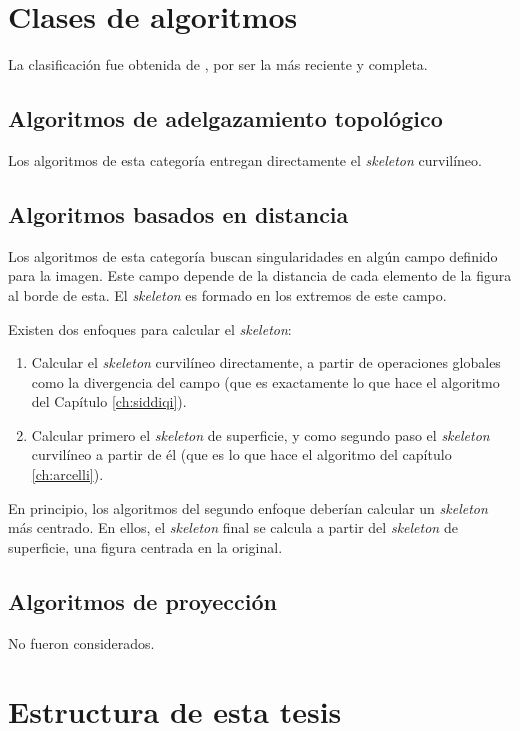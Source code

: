 \section{Clases de algoritmos}

La clasificación fue obtenida de \cite{tagliasacchi20163d}, por ser la más reciente y completa.

\subsection{Algoritmos de adelgazamiento topológico}

Los algoritmos de esta categoría entregan directamente el \textit{skeleton} curvilíneo.

\subsection{Algoritmos basados en distancia}

Los algoritmos de esta categoría buscan singularidades en algún campo definido para la imagen. Este campo depende de la distancia de cada elemento de la figura al borde de esta. El \textit{skeleton} es formado en los extremos de este campo.

Existen dos enfoques para calcular el \textit{skeleton}:

\begin{enumerate}
\item Calcular el \textit{skeleton} curvilíneo directamente, a partir de operaciones globales como la divergencia del campo (que es exactamente lo que hace el algoritmo del Capítulo \ref{ch:siddiqi}).
\item Calcular primero el \textit{skeleton} de superficie, y como segundo paso el \textit{skeleton} curvilíneo a partir de él (que es lo que hace el algoritmo del capítulo \ref{ch:arcelli}).
\end{enumerate}

En principio, los algoritmos del segundo enfoque deberían calcular un \textit{skeleton} más centrado. En ellos, el \textit{skeleton} final se calcula a partir del \textit{skeleton} de superficie, una figura centrada en la original.

\subsection{Algoritmos de proyección}

No fueron considerados.

\section{Estructura de esta tesis}


